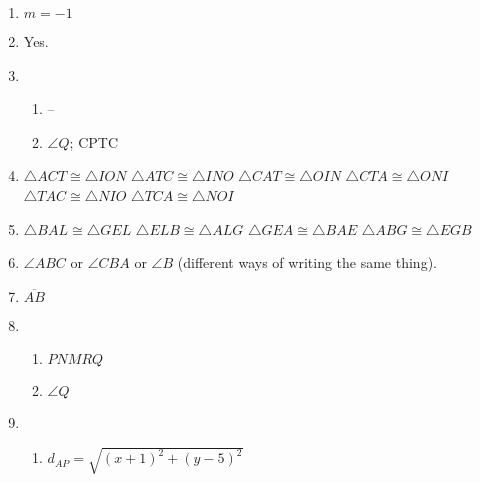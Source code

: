 \documentclass{article}
\begin{document}
\begin{enumerate}
\item $m = -1$

\item Yes.

\item 

	\begin{enumerate}
	
	\item --
	
	\item $\angle Q$; CPTC
	
	\end{enumerate}
	
\item $\triangle ACT \cong \triangle ION$ \newline
	$\triangle ATC \cong \triangle INO$ \newline
	$\triangle CAT \cong \triangle OIN$ \newline
	$\triangle CTA \cong \triangle ONI$ \newline
	$\triangle TAC \cong \triangle NIO$ \newline
	$\triangle TCA \cong \triangle NOI$
	
\item $\triangle BAL \cong \triangle GEL$ \newline
	$\triangle ELB \cong \triangle ALG$ \newline
	$\triangle GEA \cong \triangle BAE$ \newline
	$\triangle ABG \cong \triangle EGB$
	
\item $\angle ABC$ or $\angle CBA$ or $\angle B$ (different ways of writing the same thing). 

\item $\overline{AB}$

\item

	\begin{enumerate}
	
	\item $PNMRQ$
	
	\item $\angle Q$
	
	\end{enumerate}
	
\item

	\begin{enumerate}
	
	\item $d_{AP} = \sqrt{(x + 1)^2 + ( y - 5)^2}$
	

\end{enumerate}
\end{enumerate}
\end{document}
